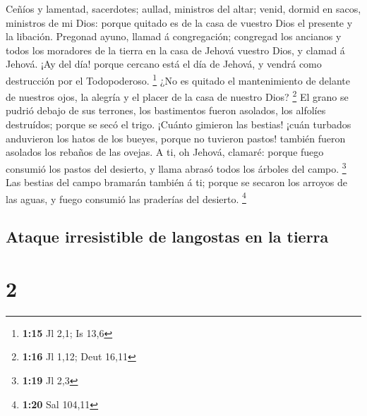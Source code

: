  Ceñíos y lamentad, sacerdotes; aullad, ministros del
altar; venid, dormid en sacos, ministros de mi Dios: porque quitado es
de la casa de vuestro Dios el presente y la libación. 
Pregonad ayuno, llamad á congregación; congregad los ancianos y todos
los moradores de la tierra en la casa de Jehová vuestro Dios, y clamad á
Jehová.  ¡Ay del día! porque cercano está el día de
Jehová, y vendrá como destrucción por el Todopoderoso. \footnote{\textbf{1:15}
  Jl 2,1; Is 13,6}  ¿No es quitado el mantenimiento de
delante de nuestros ojos, la alegría y el placer de la casa de nuestro
Dios? \footnote{\textbf{1:16} Jl 1,12; Deut 16,11}  El
grano se pudrió debajo de sus terrones, los bastimentos fueron asolados,
los alfolíes destruídos; porque se secó el trigo. 
¡Cuánto gimieron las bestias! ¡cuán turbados anduvieron los hatos de los
bueyes, porque no tuvieron pastos! también fueron asolados los rebaños
de las ovejas.  A ti, oh Jehová, clamaré: porque fuego
consumió los pastos del desierto, y llama abrasó todos los árboles del
campo. \footnote{\textbf{1:19} Jl 2,3}  Las bestias del
campo bramarán también á ti; porque se secaron los arroyos de las aguas,
y fuego consumió las praderías del desierto. \footnote{\textbf{1:20} Sal
  104,11}

\hypertarget{ataque-irresistible-de-langostas-en-la-tierra}{%
\subsection{Ataque irresistible de langostas en la
tierra}\label{ataque-irresistible-de-langostas-en-la-tierra}}

\hypertarget{section-1}{%
\section{2}\label{section-1}}

